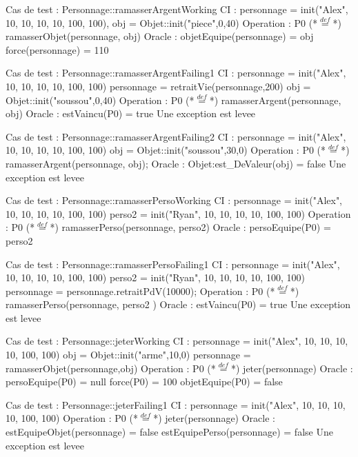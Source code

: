 \documentclass[a4paper, 11pt, notitlepage]{report}
\begin{document}
\begin{Test}
	
Cas de test : Personnage::ramasserArgentWorking
CI : personnage = init("Alex", 10, 10, 10, 10, 100, 100),
		 obj = Objet::init("piece",0,40)
Operation : P0 (*$\stackrel{def}{=}$*) ramasserObjet(personnage, obj)
Oracle :
	objetEquipe(personnage) = obj
	force(personnage) = 110

Cas de test : Personnage::ramasserArgentFailing1
CI :	personnage = init("Alex", 10, 10, 10, 10, 100, 100)
			personnage = retraitVie(personnage,200)
			obj = Objet::init("soussou",0,40)
Operation : P0 (*$\stackrel{def}{=}$*) ramasserArgent(personnage, obj)
Oracle : 
	estVaincu(P0) = true
	Une exception est levee
	
Cas de test : Personnage::ramasserArgentFailing2
CI :	personnage = init("Alex", 10, 10, 10, 10, 100, 100)
			obj = Objet::init("soussou",30,0)
Operation : P0 (*$\stackrel{def}{=}$*) ramasserArgent(personnage, obj);
Oracle : 
	Objet:est_DeValeur(obj) = false
	Une exception est levee
	
Cas de test : Personnage::ramasserPersoWorking
CI : personnage = init("Alex", 10, 10, 10, 10, 100, 100)
			perso2 = init("Ryan", 10, 10, 10, 10, 100, 100)
Operation : P0 (*$\stackrel{def}{=}$*) ramasserPerso(personnage, perso2)
Oracle :
	persoEquipe(P0) = perso2

Cas de test : Personnage::ramasserPersoFailing1
CI :	personnage = init("Alex", 10, 10, 10, 10, 100, 100)
			perso2 = init("Ryan", 10, 10, 10, 10, 100, 100)
			personnage = personnage.retraitPdV(10000);
Operation : P0 (*$\stackrel{def}{=}$*) ramasserPerso(personnage, perso2 )
Oracle : 
	estVaincu(P0) = true
	Une exception est levee
	
	
Cas de test : Personnage::jeterWorking
CI : personnage = init("Alex", 10, 10, 10, 10, 100, 100)
			obj = Objet::init("arme",10,0)
			personnage = ramasserObjet(personnage,obj)
Operation : P0 (*$\stackrel{def}{=}$*) jeter(personnage)
Oracle :
	persoEquipe(P0) = null
	force(P0) = 100
	objetEquipe(P0) = false

Cas de test : Personnage::jeterFailing1
CI :	personnage = init("Alex", 10, 10, 10, 10, 100, 100)
Operation : P0 (*$\stackrel{def}{=}$*) jeter(personnage)
Oracle : 
	estEquipeObjet(personnage) = false
	estEquipePerso(personnage) = false
	Une exception est levee
	
\end{Test}
\newpage
\end{document}
